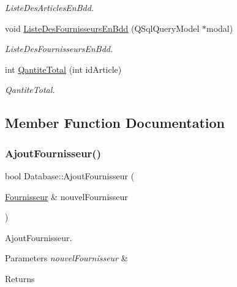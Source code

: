 \begin{DoxyCompactItemize}
\begin{DoxyCompactList}\small\item\em Liste\+Des\+Articles\+En\+Bdd. \end{DoxyCompactList}\item 
void \mbox{\hyperlink{class_database_addce242de8b2dd4ad9c4f2cde7e8da0a}{Liste\+Des\+Fournisseurs\+En\+Bdd}} (Q\+Sql\+Query\+Model $\ast$modal)
\begin{DoxyCompactList}\small\item\em Liste\+Des\+Fournisseurs\+En\+Bdd. \end{DoxyCompactList}\item 
int \mbox{\hyperlink{class_database_a4dcaf727e1e1c241b6f89d398e16c69a}{Qantite\+Total}} (int id\+Article)
\begin{DoxyCompactList}\small\item\em Qantite\+Total. \end{DoxyCompactList}\end{DoxyCompactItemize}


\subsection{Member Function Documentation}
\mbox{\label{class_database_a65fc4eaa1a4255b3ae0a5ccff9a24303}} 
\subsubsection{\texorpdfstring{Ajout\+Fournisseur()}{AjoutFournisseur()}}
{\footnotesize\ttfamily bool Database\+::\+Ajout\+Fournisseur (\begin{DoxyParamCaption}\item[{\mbox{\hyperlink{class_fournisseur}{Fournisseur}} \&}]{nouvel\+Fournisseur }\end{DoxyParamCaption})}



Ajout\+Fournisseur. 


\begin{DoxyParams}{Parameters}
{\em nouvel\+Fournisseur} & \\
\hline
\end{DoxyParams}
\begin{DoxyReturn}{Returns}

\end{DoxyReturn}
\mbox{\label{class_database_a84330285ff6131c5d496d9b7d8b277b1}} 
